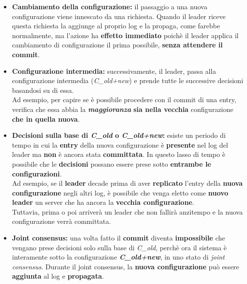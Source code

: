     \begin{itemize}
      \item{\textbf{Cambiamento della configurazione:} il passaggio a una nuova configurazione viene innescato da una richiesta. Quando il leader riceve questa richiesta la aggiunge al proprio log e la propaga, come farebbe normalmente, ma l'azione ha \textbf{effetto immediato} poichè il leader applica il cambiamento di configurazione il prima possibile, \textbf{senza attendere il commit}.}

      \item{\textbf{Configurazione intermedia:} successivamente, il leader, passa alla configurazione intermedia (\textit{C\_old+new}) e prende tutte le successive decisioni basandosi su di essa.\\
      Ad esempio, per capire se è possibile procedere con il commit di una entry, verifica che essa abbia la \textbf{\textit{maggioranza}} \textbf{sia nella vecchia} configurazione \textbf{che in quella nuova}.} 

      \item{\textbf{Decisioni sulla base di \textit{C\_old} o \textit{C\_old+new}:} esiste un periodo di tempo in cui la \textbf{entry} della nuova configurazione è \textbf{presente} nel log del leader ma \textbf{non} è ancora stata \textbf{committata}. In questo lasso di tempo è possibile che le \textbf{decisioni} possano essere prese sotto \textbf{entrambe le configurazioni}.\\ 

      Ad esempio, se il \textbf{leader} decade prima di aver \textbf{replicato} l'entry della \textbf{nuova configurazione} negli altri log, è possibile che venga eletto come \textbf{nuovo leader} un server che ha ancora la \textbf{vecchia configurazione}.\\

      Tuttavia, prima o poi arriverà un leader che non fallirà anzitempo e la nuova configurazione verrà committata. } 

      \item{\textbf{Joint consensus:} una volta fatto il \textbf{commit} diventa \textbf{impossibile} che vengano prese decisioni solo sulla base di \textit{C\_old}, perchè ora il sistema è interamente sotto la configurazione \textit{\textbf{C\_old+new}}, in uno stato di \textit{joint consensus}.
      Durante il joint consensus, la \textbf{nuova configurazione} può essere \textbf{aggiunta} al log e \textbf{propagata}.} 



\end{itemize}
